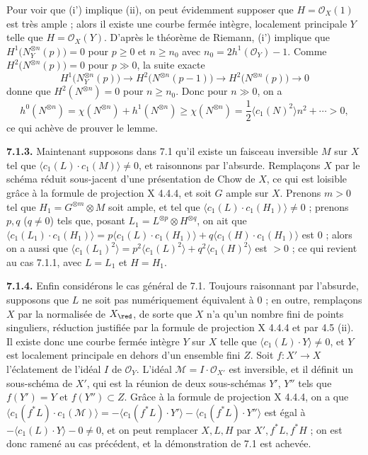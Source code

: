 Pour voir que (i') implique (ii), on peut \'evidemment supposer que $H=\mathcal O_X(1)$ est tr\`es ample ; alors il existe une courbe ferm\'ee int\`egre, localement principale $Y$ telle que $H=\mathcal O_X(Y)$. D'apr\`es le th\'eor\`eme de Riemann, (i') implique que $H^1\bigl(N_Y^{\otimes n}(p)\bigr)=0$ pour $p\geq0$ et $n\geq n_0$ avec $n_0=2h^1(\mathcal O_Y)-1$. Comme $H^2\bigl(N^{\otimes n}(p)\bigr)=0$ pour $p\gg0$, la suite exacte
\[
   H^1\bigl(N_Y^{\otimes n}(p)\bigr)
   \longrightarrow H^2\bigl(N^{\otimes n}(p-1)\bigr)
   \longrightarrow H^2\bigl(N^{\otimes n}(p)\bigr)
   \longrightarrow0
\]
donne que $H^2(N^{\otimes n})=0$ pour $n\geq n_0$. Donc pour $n\gg0$, on a
\[
   h^0(N^{\otimes n})
   =\chi(N^{\otimes n})+h^1(N^{\otimes n})
   \geq\chi(N^{\otimes n})
   =\frac{1}{2}\langle c_1(N)^2\rangle n^2+\cdots>0,
\]
ce qui ach\`eve de prouver le lemme.

\textbf{7.1.3.} Maintenant supposons dans 7.1 qu'il existe un faisceau inversible $M$ sur $X$ tel que $\langle c_1(L)\cdot c_1(M)\rangle\ne0$, et raisonnons par l'absurde. Rempla\c{c}ons $X$ par le sch\'ema r\'eduit sous-jacent d'une pr\'esentation de Chow de $X$, ce qui est loisible gr\^ace \`a la formule de projection X 4.4.4, et soit $G$ ample sur $X$. Prenons $m>0$ tel que $H_1=G^{\otimes m}\otimes M$ soit ample, et tel que $\langle c_1(L)\cdot c_1(H_1)\rangle\ne0$ ; prenons $p,q$ ($q\ne0$) tels que, posant $L_1=L^{\otimes p}\otimes H^{\otimes q}$, on ait que $\langle c_1(L_1)\cdot c_1(H_1)\rangle=p\langle c_1(L)\cdot c_1(H_1)\rangle+q\langle c_1(H)\cdot c_1(H_1)\rangle$ est $0$ ; alors on a aussi que $\langle c_1(L_1)^2\rangle=p^2\langle c_1(L)^2\rangle+q^2\langle c_1(H)^2\rangle$ est $>0$ ; ce qui revient au cas 7.1.1, avec $L=L_1$ et $H=H_1$.

\textbf{7.1.4.} Enfin consid\'erons le cas g\'en\'eral de 7.1. Toujours raisonnant par l'absurde, supposons que $L$ ne soit pas num\'eriquement \'equivalent \`a $0$ ; en outre, rempla\c{c}ons $X$ par la normalis\'ee de $X_{\red}$, de sorte que $X$ n'a qu'un
nombre fini de points singuliers, r\'eduction justifi\'ee par la formule de projection X 4.4.4 et par 4.5 (ii). Il existe donc une courbe ferm\'ee int\`egre $Y$ sur $X$ telle que $\langle c_1(L)\cdot Y\rangle\ne0$, et $Y$ est localement principale en dehors d'un ensemble fini $Z$. Soit $f:X'\to X$ l'\'eclatement de l'id\'eal $I$ de $\mathcal O_Y$. L'id\'eal $\mathcal M=I\cdot\mathcal O_{X'}$ est inversible, et il d\'efinit un sous-sch\'ema de $X'$, qui est la r\'eunion de deux sous-sch\'emas $Y'$, $Y''$ tels que $f(Y')=Y$ et $f(Y'')\subset Z$. Gr\^ace \`a la formule de projection X 4.4.4, on a que $\langle c_1(f^*L)\cdot c_1(\mathcal M)\rangle=-\langle c_1(f^*L)\cdot Y'\rangle-\langle c_1(f^*L)\cdot Y''\rangle$ est \'egal \`a $-\langle c_1(L)\cdot Y\rangle-0\ne0$, et on peut remplacer $X,L,H$ par $X',f^*L,f^*H$ ; on est donc ramen\'e au cas pr\'ec\'edent, et la d\'emonstration de 7.1 est achev\'ee.

